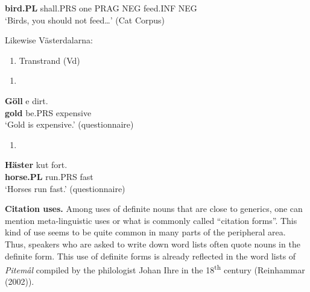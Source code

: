 \textbf{bird.PL} shall.PRS  one  PRAG  NEG  feed.INF  NEG\\ %


‘Birds, you should not feed…’ (Cat Corpus)
\z


Likewise Västerdalarna:


\begin{enumerate} %
\item 
Transtrand (Vd) 

\end{enumerate} %
\setcounter{listLFOxcviiileveli}{0}
\begin{enumerate} %
\item 
\end{enumerate} %
\ea\label{}
\gll \textbf{Göll} e  dirt.\\


\textbf{gold} be.PRS  expensive\\ %


‘Gold is expensive.’ (questionnaire)
\z


\begin{enumerate} %
\item 
\end{enumerate} %
\ea\label{}
\gll \textbf{Häster} kut  fort.\\


\textbf{horse.PL} run.PRS  fast\\ %


‘Horses run fast.’ (questionnaire)
\z


\textbf{Citation uses.} Among uses of definite nouns that are close to generics, one can mention meta-linguistic uses or what is commonly called “citation forms”. This kind of use seems to be quite common in many parts of the peripheral area. Thus, speakers who are asked to write down word lists often quote nouns in the definite form. This use of definite forms is already reflected in the word lists of \textit{Pitemål} compiled by the philologist Johan Ihre in the 18\textsuperscript{th} century (Reinhammar (2002)). 

